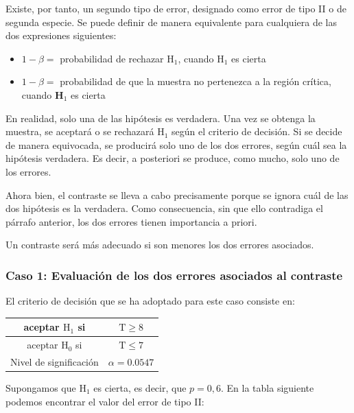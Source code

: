 \documentclass[
]{article}
\providecommand{\tightlist}{%
  \setlength{\itemsep}{0pt}\setlength{\parskip}{0pt}}
\begin{document}
Existe, por tanto, un segundo tipo de error, designado como error de tipo II o de segunda especie. Se puede definir de manera equivalente para cualquiera de las dos expresiones siguientes:

\begin{itemize}
\tightlist
\item
  \(1-\beta=\) probabilidad de rechazar \(\mathrm{H}_{1}\), cuando \(\mathrm{H}_{1}\) es cierta\\
\item
  \(1-\beta=\) probabilidad de que la muestra no pertenezca a la región crítica, cuando \(\mathbf{H}_{1}\) es cierta
\end{itemize}

En realidad, solo una de las hipótesis es verdadera. Una vez se obtenga la muestra, se aceptará o se rechazará \(\mathrm{H}_{1}\) según el criterio de decisión. Si se decide de manera equivocada, se producirá solo uno de los dos errores, según cuál sea la hipótesis verdadera. Es decir, a posteriori se produce, como mucho, solo uno de los errores.

Ahora bien, el contraste se lleva a cabo precisamente porque se ignora cuál de las dos hipótesis es la verdadera. Como consecuencia, sin que ello contradiga el párrafo anterior, los dos errores tienen importancia a priori.

Un contraste será más adecuado si son menores los dos errores asociados.

\subsubsection{Caso 1: Evaluación de los dos errores asociados al contraste}\label{caso-1-evaluaciuxf3n-de-los-dos-errores-asociados-al-contraste}

El criterio de decisión que se ha adoptado para este caso consiste en:

\begin{longtable}[]{@{}cc@{}}
\toprule\noalign{}
aceptar \(\mathrm{H}_{1}\) si & \(\mathrm{T} \geq 8\) \\
\midrule\noalign{}
\endhead
\bottomrule\noalign{}
\endlastfoot
aceptar \(\mathrm{H}_{0}\) si & \(\mathrm{T} \leq 7\) \\
Nivel de significación & \(\alpha=0.0547\) \\
\end{longtable}

Supongamos que \(\mathrm{H}_{1}\) es cierta, es decir, que \(p=0,6\). En la tabla siguiente podemos encontrar el valor del error de tipo II:
\end{document}
